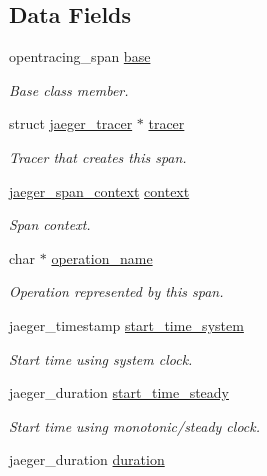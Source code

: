 \subsection*{Data Fields}
\begin{DoxyCompactItemize}
\item 
opentracing\+\_\+span \mbox{\hyperlink{structjaeger__span_a4d784dc9f217e068159cccc5f0f480e9}{base}}
\begin{DoxyCompactList}\small\item\em Base class member. \end{DoxyCompactList}\item 
struct \mbox{\hyperlink{structjaeger__tracer}{jaeger\+\_\+tracer}} $\ast$ \mbox{\hyperlink{structjaeger__span_a7cff74ecb3637cba8038d0d600d4acff}{tracer}}
\begin{DoxyCompactList}\small\item\em Tracer that creates this span. \end{DoxyCompactList}\item 
\mbox{\hyperlink{structjaeger__span__context}{jaeger\+\_\+span\+\_\+context}} \mbox{\hyperlink{structjaeger__span_a2c2ee45174f03b8453d60accd018a001}{context}}
\begin{DoxyCompactList}\small\item\em Span context. \end{DoxyCompactList}\item 
char $\ast$ \mbox{\hyperlink{structjaeger__span_afacbb7789eb032da0f25933737b61093}{operation\+\_\+name}}
\begin{DoxyCompactList}\small\item\em Operation represented by this span. \end{DoxyCompactList}\item 
jaeger\+\_\+timestamp \mbox{\hyperlink{structjaeger__span_ad3c4f8aaffedbcb41697529a486d8c96}{start\+\_\+time\+\_\+system}}
\begin{DoxyCompactList}\small\item\em Start time using system clock. \end{DoxyCompactList}\item 
jaeger\+\_\+duration \mbox{\hyperlink{structjaeger__span_a5adeeb2e496220890ec3a7f5fbb69543}{start\+\_\+time\+\_\+steady}}
\begin{DoxyCompactList}\small\item\em Start time using monotonic/steady clock. \end{DoxyCompactList}\item 
jaeger\+\_\+duration \mbox{\hyperlink{structjaeger__span_a4486fea569d2256c8e33a8b445c3f4fc}{duration}}

\end{DoxyCompactItemize}
